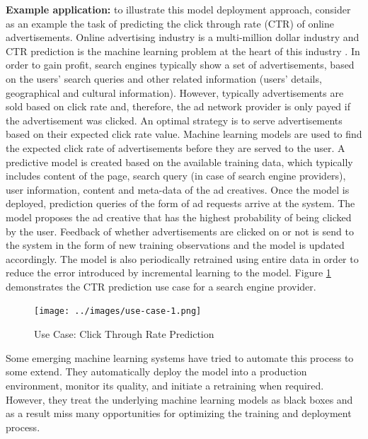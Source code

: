 \documentclass{vldb}
\begin{document}
\textbf{Example application:} to illustrate this model deployment approach, consider as an example the task of predicting the click through rate (CTR) of online advertisements.
Online advertising industry is a multi-million dollar industry and CTR prediction is the machine learning problem at the heart of this industry \cite{macmahan2013, graepel2010web} .
In order to gain profit, search engines typically show a set of advertisements, based on the users' search queries and other related information (users' details, geographical and cultural information).
However, typically advertisements are sold based on click rate and, therefore, the ad network provider is only payed if the advertisement was clicked.
An optimal strategy is to serve advertisements based on their expected click rate value.
Machine learning models are used to find the expected click rate of advertisements before they are served to the user.
A predictive model is created based on the available training data, which typically includes content of the page, search query (in case of search engine providers), user information, content and meta-data of the ad creatives. 
Once the model is deployed, prediction queries of the form of ad requests arrive at the system.
The model proposes the ad creative that has the highest probability of being clicked by the user.
Feedback of whether advertisements are clicked on or not is send to the system in the form of new training observations and the model is updated accordingly.
The model is also periodically retrained using entire data in order to reduce the error introduced by incremental learning to the model.
Figure \ref{fig:click-rate} demonstrates the CTR prediction use case for a search engine provider.

\begin{figure}[h]
\centering
\texttt{[image: ../images/use-case-1.png]}
\caption{Use Case: Click Through Rate Prediction}
\label{fig:click-rate}
\end{figure}

Some emerging machine learning systems have tried to automate this process to some extend.
They automatically deploy the model into a production environment, monitor its quality, and initiate a retraining when required.
However, they treat the underlying machine learning models as black boxes and as a result miss many opportunities for optimizing the training and deployment process.
\end{document}
